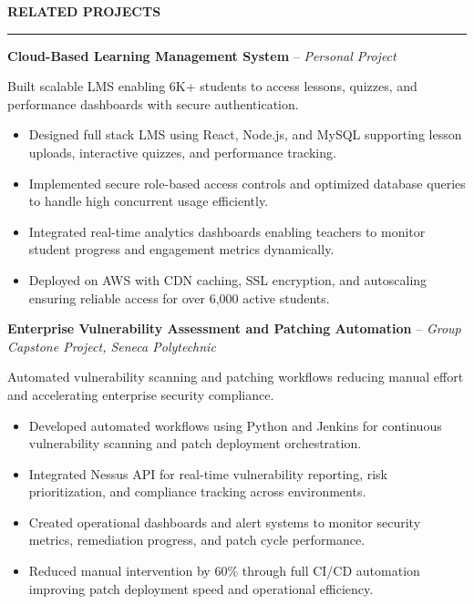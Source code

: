 \documentclass[10pt,letterpaper]{article}
\begin{document}
\vspace{6pt}

\textbf{RELATED PROJECTS}\\[-8pt]
\noindent\rule{\textwidth}{1pt}

\vspace{-2pt}

\textbf{Cloud-Based Learning Management System} -- \emph{Personal Project}

\vspace{-1pt}

Built scalable LMS enabling 6K+ students to access lessons, quizzes, and performance dashboards with secure authentication.
\vspace{-1pt}
\begin{itemize}
\item Designed full stack LMS using React, Node.js, and MySQL supporting lesson uploads, interactive quizzes, and performance tracking.
\item Implemented secure role-based access controls and optimized database queries to handle high concurrent usage efficiently.
\item Integrated real-time analytics dashboards enabling teachers to monitor student progress and engagement metrics dynamically.
\item Deployed on AWS with CDN caching, SSL encryption, and autoscaling ensuring reliable access for over 6,000 active students.
\end{itemize}

\textbf{Enterprise Vulnerability Assessment and Patching Automation} -- \emph{Group Capstone Project, Seneca Polytechnic}

\vspace{-1pt}

Automated vulnerability scanning and patching workflows reducing manual effort and accelerating enterprise security compliance.
\vspace{-1pt}
\begin{itemize}
\item Developed automated workflows using Python and Jenkins for continuous vulnerability scanning and patch deployment orchestration.
\item Integrated Nessus API for real-time vulnerability reporting, risk prioritization, and compliance tracking across environments.
\item Created operational dashboards and alert systems to monitor security metrics, remediation progress, and patch cycle performance.
\item Reduced manual intervention by 60\% through full CI/CD automation improving patch deployment speed and operational efficiency.
\end{itemize}
\end{document}
